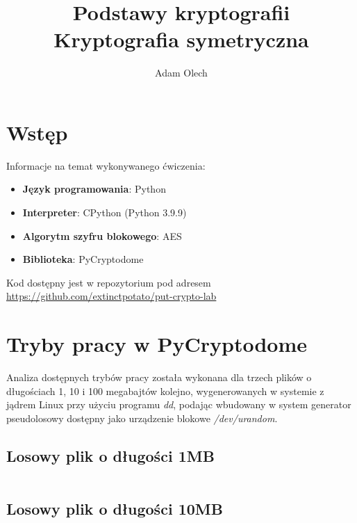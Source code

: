 \documentclass[12pt]{article}
\title{Podstawy kryptografii \\ \large Kryptografia symetryczna}
\author{Adam Olech}
\newenvironment*{dummyenv}{}{}
\begin{document}
\maketitle

\tableofcontents
\newpage

\section{Wstęp}

Informacje na temat wykonywanego ćwiczenia:

\begin{itemize}
	\item \textbf{Język programowania}: Python
	\item \textbf{Interpreter}: CPython (Python 3.9.9)
	\item \textbf{Algorytm szyfru blokowego}: AES
	\item \textbf{Biblioteka}: PyCryptodome
\end{itemize}

Kod dostępny jest w repozytorium pod adresem \url{https://github.com/extinctpotato/put-crypto-lab}

\section{Tryby pracy w PyCryptodome}

Analiza dostępnych trybów pracy została wykonana dla trzech plików o długościach
1, 10 i 100 megabajtów kolejno,
wygenerowanych w systemie z jądrem Linux przy użyciu programu \textit{dd},
podając wbudowany w system generator pseudolosowy dostępny jako urządzenie blokowe \textit{/dev/urandom}.

\subsection{Losowy plik o długości 1MB}

\begin{dummyenv}
	\inputminted[firstline=2,lastline=91]{yaml}{2-enc-dec-time.txt}
\end{dummyenv}

\subsection{Losowy plik o długości 10MB}

\begin{dummyenv}
	\inputminted[firstline=92,lastline=181]{yaml}{2-enc-dec-time.txt}
\end{dummyenv}
\end{document}
